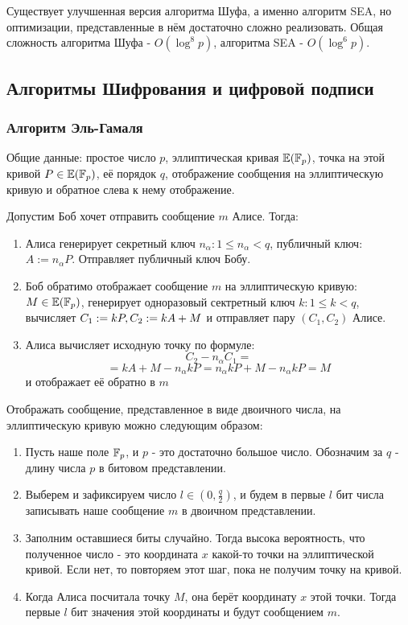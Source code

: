 \documentclass{article}
\begin{document}
   Существует улучшенная версия алгоритма Шуфа, а именно алгоритм SEA, но оптимизации, представленные в нём достаточно сложно реализовать. Общая сложность алгоритма Шуфа - $O(\log^8p)$, алгоритма SEA - $O(\log^6p)$.
  \subsection{Алгоритмы Шифрования и цифровой подписи}
  \subsubsection{Алгоритм Эль-Гамаля}
  Общие данные: простое число $p$, эллиптическая кривая $\mathbb{E}(\mathbb{F}_p)$, точка на этой кривой $P\in\mathbb{E}(\mathbb{F}_p)$, её порядок $q$, отображение сообщения на эллиптическую кривую и обратное слева к нему отображение.

  Допустим Боб хочет отправить сообщение $m$ Алисе. Тогда:
  \begin{enumerate}
    \item Алиса генерирует секретный ключ $n_\alpha\colon 1\leqslant n_\alpha<q$, публичный ключ: $A:=n_\alpha P$. Отправляет публичный ключ Бобу.
    \item Боб обратимо отображает сообщение $m$ на эллиптическую кривую: $M\in\mathbb{E}(\mathbb{F}_p)$, генерирует одноразовый сектретный ключ $k\colon 1\leqslant k<q$, вычисляет $C_1:=kP,\q C_2:=kA+M$ и отправляет пару $(C_1,C_2)$ Алисе.
    \item Алиса вычисляет исходную точку по формуле:
    \[C_2 - n_\alpha C_1 =\]\[= kA+M - n_\alpha k P = n_\alpha k P + M - n_\alpha k P = M\]
    и отображает её обратно в $m$ 
  \end{enumerate}
  
  Отображать сообщение, представленное в виде двоичного числа, на эллиптическую кривую можно следующим образом:
  \begin{enumerate}
    \item Пусть наше поле $\mathbb{F}_p$, и $p$ - это достаточно большое число. Обозначим за $q$ - длину числа $p$ в битовом представлении.
    \item Выберем и зафиксируем число $l\in (0, \frac{q}{2})$, и будем в первые $l$ бит числа записывать наше сообщение $m$ в двоичном представлении.
    \item Заполним оставшиеся биты случайно. Тогда высока вероятность, что полученное число - это координата $x$ какой-то точки на эллиптической кривой. Если нет, то повторяем этот шаг, пока не получим точку на кривой.
    \item Когда Алиса посчитала точку $M$, она берёт координату $x$ этой точки. Тогда первые $l$ бит значения этой координаты и будут сообщением $m$. 
  \end{enumerate}
\end{document}
